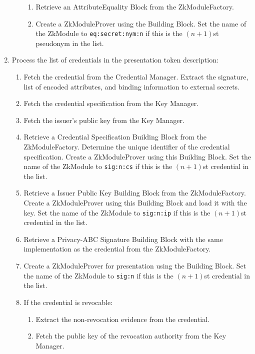 \begin{enumerate}
\begin{enumerate}
            \begin{enumerate}
              \item Retrieve an AttributeEquality Block from the ZkModuleFactory.
              \item Create a ZkModuleProver using the Building Block. Set the name of the ZkModule to
                \texttt{eq:secret:nym:n} if this is the $(n+1)$st pseudonym in the list.
            \end{enumerate}
        \end{enumerate}
      \item Process the list of credentials in the presentation token description:
        \begin{enumerate}
          \item Fetch the credential from the Credential Manager. Extract the signature, list of encoded attributes, and binding information to external secrets.
          \item Fetch the credential specification from the Key Manager.
          \item Fetch the issuer's public key from the Key Manager.
          \item Retrieve a Credential Specification Building Block from the ZkModuleFactory. Determine the unique identifier
            of the credential specification. Create a ZkModuleProver using this Building Block. Set the name of the ZkModule to
            \texttt{sig:n:cs} if this is the $(n+1)$st credential in the list.
          \item Retrieve a Issuer Public Key Building Block from the ZkModuleFactory.
            Create a ZkModuleProver using this Building Block and load it with the key. Set the name of the ZkModule to
            \texttt{sig:n:ip} if this is the $(n+1)$st credential in the list.
          \item Retrieve a Privacy-ABC Signature Building Block with the same implementation as the credential from the ZkModuleFactory.
          \item Create a ZkModuleProver for presentation using the Building Block. Set the name of the ZkModule to
            \texttt{sig:n} if this is the $(n+1)$st credential in the list.
          \item If the credential is revocable:
            \begin{enumerate}
              \item Extract the non-revocation evidence from the credential.
              \item Fetch the public key of the revocation authority from the Key Manager.

\end{enumerate}
\end{enumerate}
\end{enumerate}
